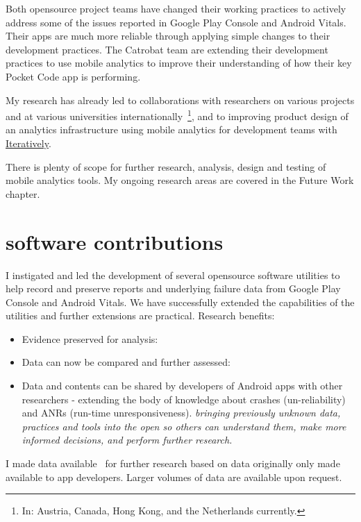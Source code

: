 Both opensource project teams have changed their working practices to actively address some of the issues reported in Google Play Console and Android Vitals. Their apps are much more reliable through applying simple changes to their development practices. The Catrobat team are extending their development practices to use mobile analytics to improve their understanding of how their key Pocket Code app is performing.

My research has already led to collaborations with researchers on various projects and at various universities internationally~\footnote{In: Austria, Canada, Hong Kong, and the Netherlands currently.}, and to improving product design of an analytics infrastructure using mobile analytics for development teams with \href{https://iterative.ly/}{Iteratively}. 

There is plenty of scope for further research, analysis, design and testing of mobile analytics tools. My ongoing research areas are covered in the Future Work chapter.

\section{software contributions}
I instigated and led the development of several opensource software utilities to help record and preserve reports and underlying failure data from Google Play Console and Android Vitals. We have successfully extended the capabilities of the utilities and further extensions are practical. Research benefits:
\begin{itemize}
    \item Evidence preserved for analysis:
    \item Data can now be compared and further assessed:
    \item Data and contents can be shared by developers of Android apps with other researchers - extending the body of knowledge about crashes (un-reliability) and ANRs (run-time unresponsiveness). \emph{bringing previously unknown data, practices and tools into the open so others can understand them, make more informed decisions, and perform further research.}
\end{itemize}

I made data available~\cite{harty_wama_dataset_examples} for further research based on data originally only made available to app developers. Larger volumes of data are available upon request.

